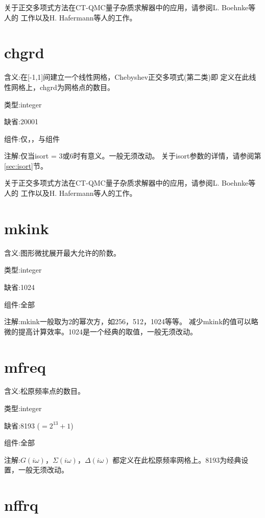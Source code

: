 关于正交多项式方法在CT-QMC量子杂质求解器中的应用，请参阅L. Boehnke等人的
工作\cite{ortho:075145}以及H. Hafermann等人的工作\cite{hh:2011}。

\section{chgrd }
\label{sec:chgrd}

{\color{red}含义}:在[-1,1]间建立一个线性网格，Chebyshev正交多项式(第二类)即
定义在此线性网格上，chgrd为网格点的数目。

{\color{green}类型}:integer

{\color{blue}缺省}:20001

{\color{brown}组件}:仅{\gardenia}，{\narcissus}，与{\lavender}组件

{\color{purple}注解}:仅当isort = 3或6时有意义。一般无须改动。
关于isort参数的详情，请参阅第\ref{sec:isort}节。

关于正交多项式方法在CT-QMC量子杂质求解器中的应用，请参阅L. Boehnke等人的
工作\cite{ortho:075145}以及H. Hafermann等人的工作\cite{hh:2011}。

\section{mkink }
\label{sec:mkink}

{\color{red}含义}:图形微扰展开最大允许的阶数。

{\color{green}类型}:integer

{\color{blue}缺省}:1024

{\color{brown}组件}:全部

{\color{purple}注解}:mkink一般取为2的幂次方，如256，512，1024等等。
减少mkink的值可以略微的提高计算效率。1024是一个经典的取值，一般无须改动。

\section{mfreq }
\label{sec:mfreq}

{\color{red}含义}:松原频率点的数目。

{\color{green}类型}:integer

{\color{blue}缺省}:8193 ($= 2^{13} + 1$)

{\color{brown}组件}:全部

{\color{purple}注解}:$G(i\omega)$，$\Sigma(i\omega)$，$\Delta(i\omega)$
都定义在此松原频率网格上。8193为经典设置，一般无须改动。

\section{nffrq }
\label{sec:nffrq}


